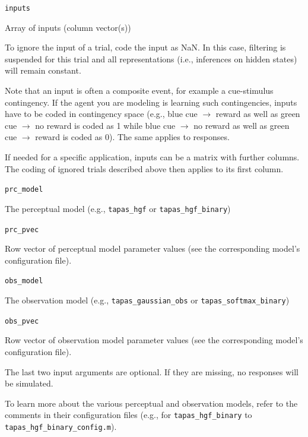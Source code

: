 \documentclass[11pt,a4paper]{article}
\numberwithin{equation}{section}
\begin{document}
\begin{description}
  \item{\texttt{inputs}}

    Array of inputs (column vector(s))

    To ignore the input of a trial, code the input as NaN. In this
    case, filtering is suspended for this trial and all
    representations (i.e., inferences on hidden states) will remain
    constant.

    Note that an input is often a composite event, for example a
    cue-stimulus contingency. If the agent you are modeling is learning
    such contingencies, inputs have to be coded in contingency space
    (e.g., blue cue $\rightarrow$ reward as well as green cue
    $\rightarrow$ no reward is coded as 1 while blue cue $\rightarrow$
    no reward as well as green cue $\rightarrow$ reward is coded as
    0). The same applies to responses.

    If needed for a specific application, inputs can be a matrix with
    further columns. The coding of ignored trials described above then
    applies to its first column.

  \item{\texttt{prc\_model}}

    The perceptual model (e.g., \texttt{tapas\_hgf} or \texttt{tapas\_hgf\_binary})

  \item{\texttt{prc\_pvec}}

    Row vector of perceptual model parameter values (see the
    corresponding model's configuration file).

  \item{\texttt{obs\_model}}

    The observation model (e.g., \texttt{tapas\_gaussian\_obs} or \texttt{tapas\_softmax\_binary})

  \item{\texttt{obs\_pvec}}

    Row vector of observation model parameter values (see the
    corresponding model's configuration file).

\end{description}

The last two input arguments are optional. If they are missing, no
responses will be simulated.

To learn more about the various perceptual and observation models,
refer to the comments in their configuration files (e.g., for
\texttt{tapas\_hgf\_binary} to
\linebreak\texttt{tapas\_hgf\_binary\_config.m}).
\end{document}
